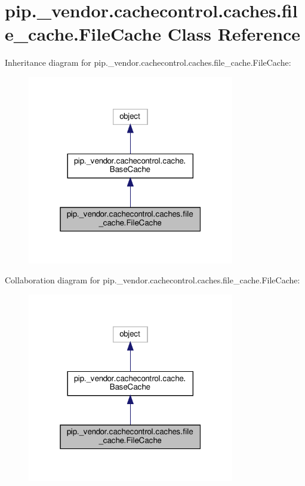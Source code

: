 \hypertarget{classpip_1_1__vendor_1_1cachecontrol_1_1caches_1_1file__cache_1_1FileCache}{}\section{pip.\+\_\+vendor.\+cachecontrol.\+caches.\+file\+\_\+cache.\+File\+Cache Class Reference}
\label{classpip_1_1__vendor_1_1cachecontrol_1_1caches_1_1file__cache_1_1FileCache}


Inheritance diagram for pip.\+\_\+vendor.\+cachecontrol.\+caches.\+file\+\_\+cache.\+File\+Cache\+:
\nopagebreak
\begin{figure}[H]
\begin{center}
\leavevmode
\includegraphics[width=256pt]{classpip_1_1__vendor_1_1cachecontrol_1_1caches_1_1file__cache_1_1FileCache__inherit__graph}
\end{center}
\end{figure}


Collaboration diagram for pip.\+\_\+vendor.\+cachecontrol.\+caches.\+file\+\_\+cache.\+File\+Cache\+:
\nopagebreak
\begin{figure}[H]
\begin{center}
\leavevmode
\includegraphics[width=256pt]{classpip_1_1__vendor_1_1cachecontrol_1_1caches_1_1file__cache_1_1FileCache__coll__graph}
\end{center}
\end{figure}
